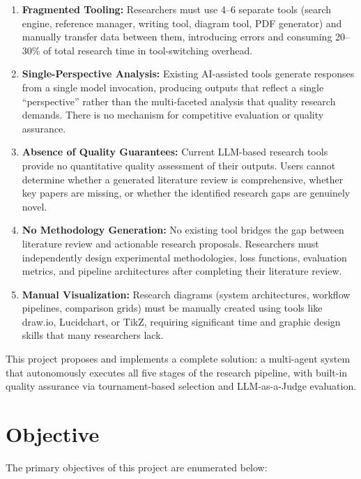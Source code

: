 \documentclass[a4paper,12pt,openany]{report}
\begin{document}
\begin{enumerate}[label=\arabic*., leftmargin=2cm]
\item \textbf{Fragmented Tooling:} Researchers must use 4--6 separate tools (search engine, reference manager, writing tool, diagram tool, PDF generator) and manually transfer data between them, introducing errors and consuming 20--30\% of total research time in tool-switching overhead.

\item \textbf{Single-Perspective Analysis:} Existing AI-assisted tools generate responses from a single model invocation, producing outputs that reflect a single ``perspective'' rather than the multi-faceted analysis that quality research demands. There is no mechanism for competitive evaluation or quality assurance.

\item \textbf{Absence of Quality Guarantees:} Current LLM-based research tools provide no quantitative quality assessment of their outputs. Users cannot determine whether a generated literature review is comprehensive, whether key papers are missing, or whether the identified research gaps are genuinely novel.

\item \textbf{No Methodology Generation:} No existing tool bridges the gap between literature review and actionable research proposals. Researchers must independently design experimental methodologies, loss functions, evaluation metrics, and pipeline architectures after completing their literature review.

\item \textbf{Manual Visualization:} Research diagrams (system architectures, workflow pipelines, comparison grids) must be manually created using tools like draw.io, Lucidchart, or TikZ, requiring significant time and graphic design skills that many researchers lack.
\end{enumerate}

This project proposes and implements a complete solution: a multi-agent system that autonomously executes all five stages of the research pipeline, with built-in quality assurance via tournament-based selection and LLM-as-a-Judge evaluation.

\section{Objective}

The primary objectives of this project are enumerated below:
\end{document}
